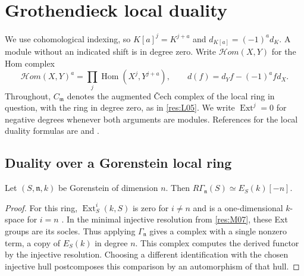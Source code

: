 \chapter{Grothendieck local duality}\label{ch:local-duality}

We use cohomological indexing, so $K[a]^j=K^{j+a}$ and
$d_{K[a]}=(-1)^a d_K$. A module without an indicated shift is
in degree zero. Write $\mathcal H om(X,Y)$ for the Hom complex
\[
 \mathcal H om(X,Y)^a=\prod_j\operatorname{Hom}(X^j,Y^{j+a}),
 \qquad d(f)=d_Y f-(-1)^a f d_X .
\]
Throughout, $C_{\mathfrak m}$ denotes the augmented \v{C}ech
complex of the local ring in question, with the ring in degree
zero, as in \ref{res:L05}. We write $\operatorname{Ext}^j=0$ for
negative degrees whenever both arguments are modules. References
for the local duality formulas are \cite[Sections 18--22]{st-dual}
and \cite[Section 3.5]{bruns}.

\section{Duality over a Gorenstein local ring}

\begin{proposition}\label{res:D01}
Let $(S,\mathfrak n,k)$ be Gorenstein of dimension $n$. Then
$R\Gamma_{\mathfrak n}(S)\simeq E_S(k)[-n]$.
\end{proposition}
\begin{proof}
For this ring, $\operatorname{Ext}^i_S(k,S)$ is zero for $i\ne n$
and is a one-dimensional $k$-space for $i=n$
\cite[GC-06]{core}. In the minimal injective resolution from
\ref{res:M07}, these Ext groups are its socles. Thus applying
$\Gamma_{\mathfrak n}$ gives a complex with a single nonzero term,
a copy of $E_S(k)$ in degree $n$. This complex computes the derived
functor by the injective resolution. Choosing a different
identification with the chosen injective hull postcomposes this
comparison by an automorphism of that hull.
\end{proof}


